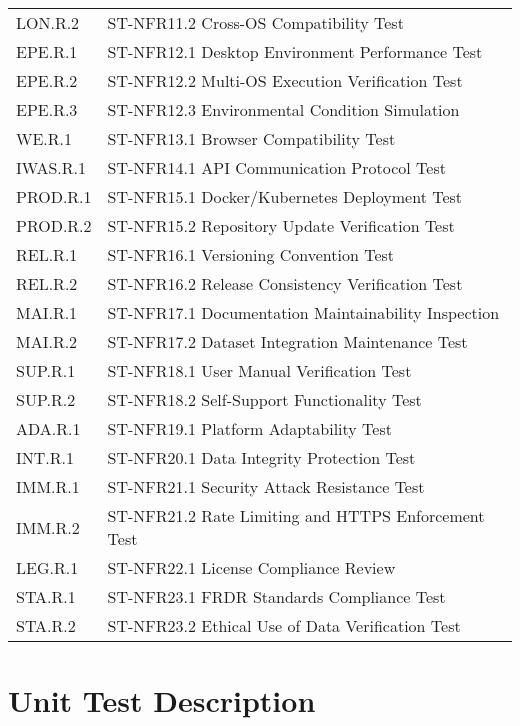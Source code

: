 \documentclass[12pt, titlepage]{article}
\begin{document}
\begin{longtable}{|l|p{10cm}|}
LON.R.2 & ST-NFR11.2 Cross-OS Compatibility Test \\
EPE.R.1 & ST-NFR12.1 Desktop Environment Performance Test \\
EPE.R.2 & ST-NFR12.2 Multi-OS Execution Verification Test \\
EPE.R.3 & ST-NFR12.3 Environmental Condition Simulation \\
WE.R.1 & ST-NFR13.1 Browser Compatibility Test \\
IWAS.R.1 & ST-NFR14.1 API Communication Protocol Test \\
PROD.R.1 & ST-NFR15.1 Docker/Kubernetes Deployment Test \\
PROD.R.2 & ST-NFR15.2 Repository Update Verification Test \\
REL.R.1 & ST-NFR16.1 Versioning Convention Test \\
REL.R.2 & ST-NFR16.2 Release Consistency Verification Test \\
MAI.R.1 & ST-NFR17.1 Documentation Maintainability Inspection \\
MAI.R.2 & ST-NFR17.2 Dataset Integration Maintenance Test \\
SUP.R.1 & ST-NFR18.1 User Manual Verification Test \\
SUP.R.2 & ST-NFR18.2 Self-Support Functionality Test \\
ADA.R.1 & ST-NFR19.1 Platform Adaptability Test \\
INT.R.1 & ST-NFR20.1 Data Integrity Protection Test \\
IMM.R.1 & ST-NFR21.1 Security Attack Resistance Test \\
IMM.R.2 & ST-NFR21.2 Rate Limiting and HTTPS Enforcement Test \\
LEG.R.1 & ST-NFR22.1 License Compliance Review \\
STA.R.1 & ST-NFR23.1 FRDR Standards Compliance Test \\
STA.R.2 & ST-NFR23.2 Ethical Use of Data Verification Test \\

\end{longtable}



\section{Unit Test Description}

\end{document}
